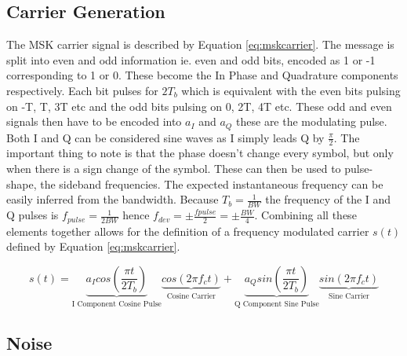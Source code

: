 \subsection{Carrier Generation}
The MSK carrier signal is described by Equation \ref{eq:mskcarrier}. The message is split into even and odd information ie. even and odd bits, encoded as 1 or -1 corresponding to 1 or 0. These become the In Phase and Quadrature components respectively. Each bit pulses for $2T_b$ which is equivalent with the even bits pulsing on -T, T, 3T etc and the odd bits pulsing on 0, 2T, 4T etc. These odd and even signals then have to be encoded into $a_I$ and $a_Q$ these are the modulating pulse. Both I and Q can be considered sine waves as I simply leads Q by $\frac{\pi}{2}$. The important thing to note is that the phase doesn't change every symbol, but only when there is a sign change of the symbol.
These can then be used to pulse-shape, the sideband frequencies. The expected instantaneous frequency can be easily inferred from the bandwidth. Because $T_b = \frac{1}{BW}$ the frequency of the I and Q pulses is $f_{pulse} = \frac{1}{2BW}$ hence $f_{dev} = \pm\frac{f{pulse}}{2}=\pm\frac{BW}{4}$. Combining all these elements together allows for the definition of a frequency modulated carrier $s(t)$ defined by Equation \ref{eq:mskcarrier}.


\begin{equation}
s(t) = \underbrace{a_I cos\left(\frac{\pi t}{2T_b}\right)}_{\text{I Component Cosine Pulse}}\underbrace{cos(2\pi f_ct)}_{\text{Cosine Carrier}} + \underbrace{a_Qsin\left(\frac{\pi t}{2T_b}\right)}_{\text{Q Component Sine Pulse}}\underbrace{sin(2\pi f_ct)}_{\text{Sine Carrier}}
\label{eq:mskcarrier}
\end{equation}

\subsection{Noise}
